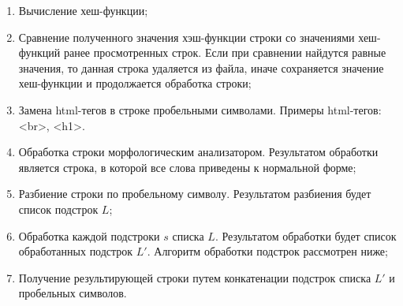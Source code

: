 \documentclass[a4paper]{report}
\begin{document}
	\begin{enumerate}
	\item{ Вычисление хеш-функции; }
	\item{ Сравнение полученного значения хэш-функции строки со значениями хеш-функций ранее просмотренных строк. Если при сравнении найдутся равные значения, то данная строка удаляется из файла, иначе сохраняется значение хеш-функции и продолжается обработка строки; }
	
	\item{ Замена html-тегов в строке пробельными символами. Примеры html-тегов: <br>, <h1>. }
	
	\item{ Обработка строки морфологическим анализатором. Результатом обработки является строка, в которой все слова приведены к нормальной форме; }
	\item{ Разбиение строки по пробельному символу. Результатом разбиения будет список подстрок $L$; }
	\item{ Обработка каждой подстроки $s$ списка $L$. Результатом обработки будет список обработанных подстрок $L'$. Алгоритм обработки подстрок рассмотрен ниже;}
	\item{ Получение результирующей строки путем конкатенации подстрок списка $L'$ и пробельных символов.}
	\end{enumerate}
	
\end{document}
